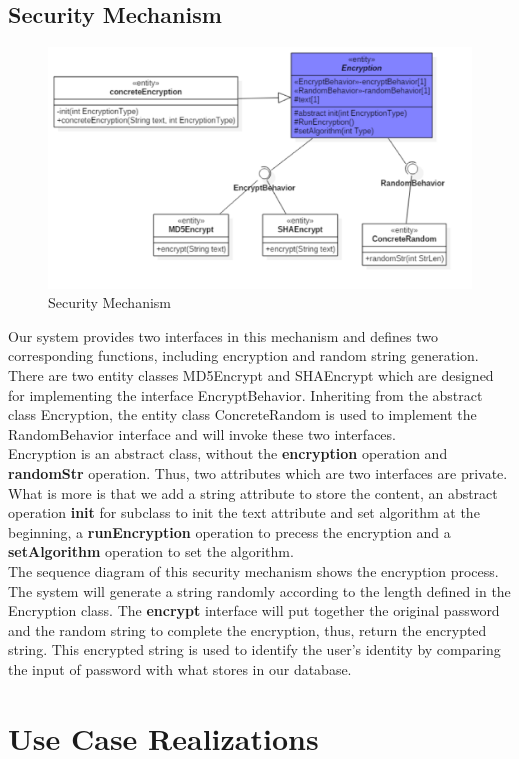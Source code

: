 \documentclass[12pt]{scrreprt}
\begin{document}
\subsection{Security Mechanism}
\begin{figure}[htbp]
	\centering\includegraphics[width=6in]{DocumentRes/SecurityMechanism.png}
	\caption{Security Mechanism}
\end{figure}
Our system provides two interfaces in this mechanism and defines two corresponding functions, including encryption and random string generation. There are two entity classes MD5Encrypt and SHAEncrypt which are designed for implementing the interface EncryptBehavior. Inheriting from the abstract class Encryption, the entity class ConcreteRandom is used to implement the RandomBehavior interface and will invoke these two interfaces.\\
Encryption is an abstract class, without the \textbf{encryption} operation and \textbf{randomStr} operation. Thus, two attributes which are two interfaces are private. What is more is that we add a string attribute to store the content, an abstract operation \textbf{init} for subclass to init the text attribute and set algorithm at the beginning, a \textbf{runEncryption} operation to precess the encryption and a \textbf{setAlgorithm} operation to set the algorithm.\\
The sequence diagram of this security mechanism shows the encryption process. The system will generate a string randomly according to the length defined in the Encryption class. The \textbf{encrypt} interface will put together the original password and the random string to complete the encryption, thus, return the encrypted string. This encrypted string is used to identify the user's identity by comparing the input of password with what stores in our database.
\section{Use Case Realizations}
\end{document}

